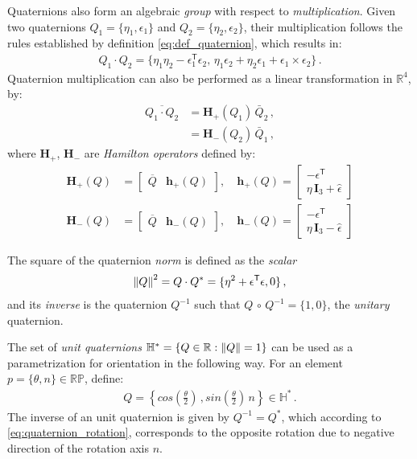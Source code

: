 Quaternions also form an algebraic {\it group} with respect to {\it multiplication}.
Given two quaternions $Q_1=\{\eta_1,\epsilon_1\}$ and $Q_2=\{\eta_2,\epsilon_2\}$, their multiplication follows the rules established by definition \eqref{eq:def_quaternion}, which results in:
%
\begin{align}
Q_1\cdot Q_2 = \{\eta_1\eta_2 - \epsilon_1^\mathsf{T}\epsilon_2 ,\, \eta_1\epsilon_2 + \eta_2\epsilon_1 + \epsilon_1 \times \epsilon_2 \} \,.
\label{eq:quaternion_product}
\end{align}
%
Quaternion multiplication can also be performed as a linear transformation in $\mathbb{R}^4$, by:
%
\begin{align}
\overline{Q_1 \cdot Q_2} &= \mathbf{H}_+(Q_1) \, \bar{Q}_2 \,, \\
&= \mathbf{H}_-(Q_2) \, \bar{Q}_1 \,,
\label{eq:multipl_Hamilton}
\end{align}
%
where $\mathbf{H}_+$, $\mathbf{H}_-$ are {\it Hamilton operators} defined by:
%
\begin{align}
\mathbf{H}_+(Q) &= \left[ \begin{array}{cc}
\overline{Q} & \mathbf{h}_+(Q)
\end{array} \right], \quad
%
\mathbf{h}_+(Q) = 
\left[ \begin{array}{cc}
-\epsilon^\mathsf{T} \\
\eta \, \mathbf{I}_3 + \widehat{\epsilon}
\end{array} \right] \\
%
\mathbf{H}_-(Q) &= \left[ \begin{array}{cc}
\overline{Q} & \mathbf{h}_-(Q)
\end{array} \right], \quad
%
\mathbf{h}_-(Q) = 
\left[ \begin{array}{cc}
-\epsilon^\mathsf{T} \\
\eta \, \mathbf{I}_3 - \widehat{\epsilon}
\end{array} \right]
\label{eq:Hamilton_op}
\end{align}

The square of the quaternion \textit{norm} is defined as the \textit{scalar}
%
\begin{align}
\left\lVert Q\right\rVert^2 = Q \cdot Q^* = \{ \eta^2 + \epsilon^\mathsf{T} \epsilon , 0 \} \,,
\end{align}
%
and its \textit{inverse} is the quaternion $Q^{-1}$ such that $Q \,\circ\, Q^{-1} = \{1,0\}$, the {\it unitary} quaternion.

The set of \textit{unit quaternions} $\mathbb{H}^* = \{ Q \in \mathbb{R}: \left\lVert Q\right\rVert = 1 \}$ can be used as a parametrization for orientation in the following way.
%
For an element $p = \{\theta,n\}\in \mathbb{RP}$, define:
%
\begin{align}
Q = \left\{cos\left(\frac{\theta}{2}\right) \,, sin\left(\frac{\theta}{2}\right)\,n\right\} \in \mathbb{H}^* \,.
\label{eq:quaternion_rotation}
\end{align}
%
The inverse of an unit quaternion is given by $Q^{-1} \!\!=\!\! Q^*$, which according to \eqref{eq:quaternion_rotation}, corresponds to the opposite rotation due to negative direction of the rotation axis $n$.

